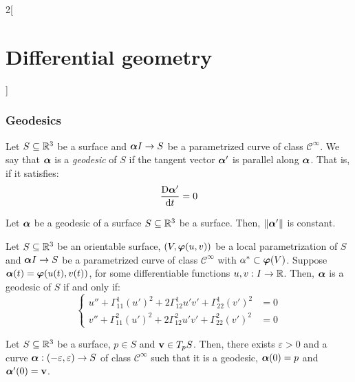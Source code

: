 \documentclass[../../../main.tex]{subfiles}
\begin{document}
\begin{multicols}{2}[\section{Differential geometry}]
  \subsubsection{Geodesics}
  \begin{definition}
    Let $S\subseteq\mathbb{R}^3$ be a surface and $\boldsymbol{\mathrm{\alpha}} I\rightarrow S$ be a parametrized curve of class $\mathcal{C}^\infty$. We say that $\boldsymbol{\mathrm{\alpha}}$ is a \emph{geodesic} of $S$ if the tangent vector $\boldsymbol{\mathrm{\alpha}}'$ is parallel along $\boldsymbol{\mathrm{\alpha}}$. That is, if it satisfies: $$\frac{\text{D}\boldsymbol{\mathrm{\alpha}}'}{\dd{t}}=0$$
  \end{definition}
  \begin{proposition}
    Let $\boldsymbol{\mathrm{\alpha}}$ be a geodesic of a surface $S\subseteq\mathbb{R}^3$ be a surface. Then, $\|\boldsymbol{\mathrm{\alpha}}'\|$ is constant.
  \end{proposition}
  \begin{proposition}
    Let $S\subseteq\mathbb{R}^3$ be an orientable surface, $(V,\boldsymbol{\mathrm{\varphi}}(u,v))$ be a local parametrization of $S$ and $\boldsymbol{\mathrm{\alpha}} I\rightarrow S$ be a parametrized curve of class $\mathcal{C}^\infty$ with $\alpha^*\subset\boldsymbol{\mathrm{\varphi}}(V)$. Suppose $\boldsymbol{\mathrm{\alpha}}(t)=\boldsymbol{\mathrm{\varphi}}(u(t),v(t))$, for some differentiable functions $u,v:I\rightarrow\mathbb{R}$. Then, $\boldsymbol{\mathrm{\alpha}}$ is a geodesic of $S$ if and only if:
    $$\left\{
      \begin{aligned}
        u''+\Gamma_{11}^1{(u')}^2+2\Gamma_{12}^1u'v'+\Gamma_{22}^1{(v')}^2 & =0 \\
        v''+\Gamma_{11}^2{(u')}^2+2\Gamma_{12}^2u'v'+\Gamma_{22}^2{(v')}^2 & =0
      \end{aligned}
      \right.
    $$
  \end{proposition}
  \begin{proposition}
    Let $S\subseteq\mathbb{R}^3$ be a surface, $p\in S$ and $\boldsymbol{\mathrm{v}}\in T_pS$. Then, there exists $\varepsilon>0$ and a curve $\boldsymbol{\mathrm{\alpha}}:(-\varepsilon,\varepsilon)\rightarrow S$ of class $\mathcal{C}^\infty$ such that it is a geodesic, $\boldsymbol{\mathrm{\alpha}}(0)=p$ and $\boldsymbol{\mathrm{\alpha}}'(0)=\boldsymbol{\mathrm{v}}$.
  \end{proposition}

\end{multicols}
\end{document}
